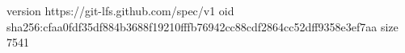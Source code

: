 version https://git-lfs.github.com/spec/v1
oid sha256:cfaa0fdf35df884b3688f19210fffb76942cc88cdf2864cc52dff9358e3ef7aa
size 7541
